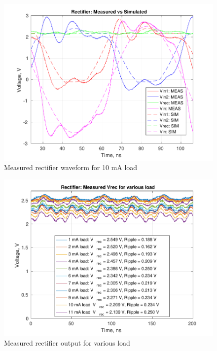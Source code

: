 \documentclass[12pt,a4paper,UKenglish]{article}
\begin{document}
\begin{figure} [!htbp]
  \centering
  \includegraphics[width=\textwidth]{img/meas/rect_10ma.pdf} 
 \caption{Measured rectifier waveform for 10 mA load} 
\label{fig:meas_rect_10ma} 
\end{figure}

\begin{figure} [!htbp]
  \centering
  \includegraphics[width=\textwidth]{img/meas/rect_load_sweep.pdf} 
 \caption{Measured rectifier output for various load} 
\label{fig:meas_rect_load_sweep} 
\end{figure}


\clearpage
\newpage
\nocite{*}
\printbibliography

\newpage
\listoffigures

\newpage
\listoftables

\newpage
\printnoidxglossaries
\end{document}

